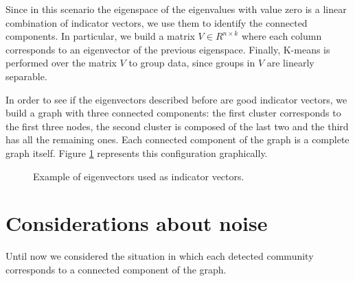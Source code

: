 \documentclass{article}
\begin{document}
Since in this scenario the eigenspace of the eigenvalues with value zero
is a linear combination of indicator vectors, we use them to identify the connected components.
In particular, we build a matrix $V \in \mathit{R}^{n \times k}$ where each column corresponds to
an eigenvector of the previous eigenspace.
Finally, K-means is performed over the matrix $V$ to group data,
since groups in $V$ are linearly separable.

In order to see if the eigenvectors described before are good indicator vectors,
we build a graph with three connected components:
the first cluster corresponds to the first three nodes,
the second cluster is composed of the last two and the third has all the remaining ones.
Each connected component of the graph is a complete graph itself.
Figure \ref{figure:eivects} represents this configuration graphically.

\begin{figure}[hb]
    \hfill
    \hfill
    \hfill
    \hfill
    \caption{Example of eigenvectors used as indicator vectors.}%
    \label{figure:eivects}%
\end{figure}

\section{Considerations about noise} \label{section:noisecom}
Until now we considered the situation in which each detected community
corresponds to a connected component of the graph.
\end{document}
